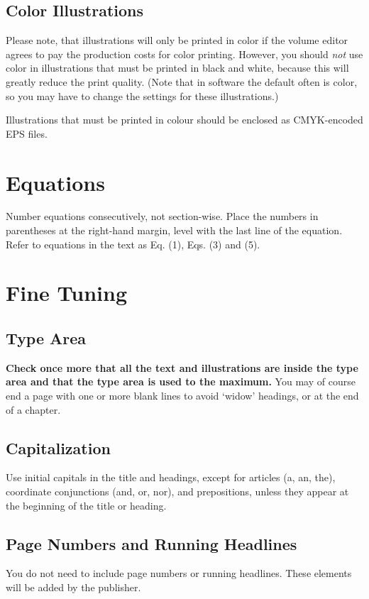 \documentclass{IOS-Book-Article}
\begin{document}
\subsection{Color Illustrations}
Please note, that illustrations will only be printed in color if the volume editor agrees to
pay the production costs for color printing. However, you should \textit{not} use color in
illustrations that must be printed in black and white, because this will greatly reduce the
print quality. (Note that in software the default often is color, so you may have to
change the settings for these illustrations.)

Illustrations that must be printed in colour should be enclosed as CMYK-encoded
EPS files.


\section{Equations}
Number equations consecutively, not section-wise. Place the numbers in parentheses at
the right-hand margin, level with the last line of the equation. Refer to equations in the
text as Eq. (1), Eqs. (3) and (5).

\section{Fine Tuning}

\subsection{Type Area}
\textbf{Check once more that all the text and illustrations are inside the type area and
that the type area is used to the maximum.} You may of course end a page with one
or more blank lines to avoid `widow' headings, or at the end of a chapter.

\subsection{Capitalization}
Use initial capitals in the title and headings, except for articles (a, an, the), coordinate
conjunctions (and, or, nor), and prepositions, unless they appear at the beginning of the
title or heading.

\subsection{Page Numbers and Running Headlines}
You do not need to include page numbers or running headlines. These elements will be
added by the publisher.
\end{document}
